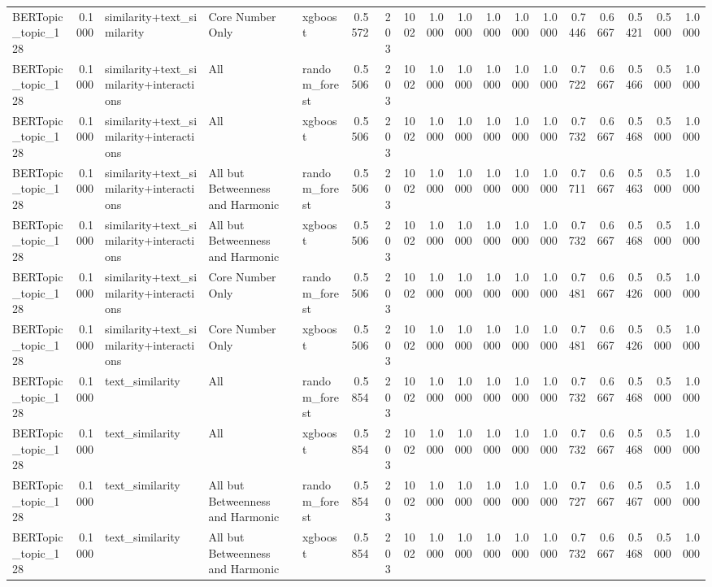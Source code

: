 \begin{tabular}{lrlllrrrrrrrrrrrrr}
BERTopic_topic_128 & 0.1000 & similarity+text_similarity & Core Number Only & xgboost & 0.5572 & 203 & 1002 & 1.0000 & 1.0000 & 1.0000 & 1.0000 & 1.0000 & 0.7446 & 0.6667 & 0.5421 & 0.5000 & 1.0000 \\
BERTopic_topic_128 & 0.1000 & similarity+text_similarity+interactions & All & random_forest & 0.5506 & 203 & 1002 & 1.0000 & 1.0000 & 1.0000 & 1.0000 & 1.0000 & 0.7722 & 0.6667 & 0.5466 & 0.5000 & 1.0000 \\
BERTopic_topic_128 & 0.1000 & similarity+text_similarity+interactions & All & xgboost & 0.5506 & 203 & 1002 & 1.0000 & 1.0000 & 1.0000 & 1.0000 & 1.0000 & 0.7732 & 0.6667 & 0.5468 & 0.5000 & 1.0000 \\
BERTopic_topic_128 & 0.1000 & similarity+text_similarity+interactions & All but Betweenness and Harmonic & random_forest & 0.5506 & 203 & 1002 & 1.0000 & 1.0000 & 1.0000 & 1.0000 & 1.0000 & 0.7711 & 0.6667 & 0.5463 & 0.5000 & 1.0000 \\
BERTopic_topic_128 & 0.1000 & similarity+text_similarity+interactions & All but Betweenness and Harmonic & xgboost & 0.5506 & 203 & 1002 & 1.0000 & 1.0000 & 1.0000 & 1.0000 & 1.0000 & 0.7732 & 0.6667 & 0.5468 & 0.5000 & 1.0000 \\
BERTopic_topic_128 & 0.1000 & similarity+text_similarity+interactions & Core Number Only & random_forest & 0.5506 & 203 & 1002 & 1.0000 & 1.0000 & 1.0000 & 1.0000 & 1.0000 & 0.7481 & 0.6667 & 0.5426 & 0.5000 & 1.0000 \\
BERTopic_topic_128 & 0.1000 & similarity+text_similarity+interactions & Core Number Only & xgboost & 0.5506 & 203 & 1002 & 1.0000 & 1.0000 & 1.0000 & 1.0000 & 1.0000 & 0.7481 & 0.6667 & 0.5426 & 0.5000 & 1.0000 \\
BERTopic_topic_128 & 0.1000 & text_similarity & All & random_forest & 0.5854 & 203 & 1002 & 1.0000 & 1.0000 & 1.0000 & 1.0000 & 1.0000 & 0.7732 & 0.6667 & 0.5468 & 0.5000 & 1.0000 \\
BERTopic_topic_128 & 0.1000 & text_similarity & All & xgboost & 0.5854 & 203 & 1002 & 1.0000 & 1.0000 & 1.0000 & 1.0000 & 1.0000 & 0.7732 & 0.6667 & 0.5468 & 0.5000 & 1.0000 \\
BERTopic_topic_128 & 0.1000 & text_similarity & All but Betweenness and Harmonic & random_forest & 0.5854 & 203 & 1002 & 1.0000 & 1.0000 & 1.0000 & 1.0000 & 1.0000 & 0.7727 & 0.6667 & 0.5467 & 0.5000 & 1.0000 \\
BERTopic_topic_128 & 0.1000 & text_similarity & All but Betweenness and Harmonic & xgboost & 0.5854 & 203 & 1002 & 1.0000 & 1.0000 & 1.0000 & 1.0000 & 1.0000 & 0.7732 & 0.6667 & 0.5468 & 0.5000 & 1.0000 \\

\end{tabular}
